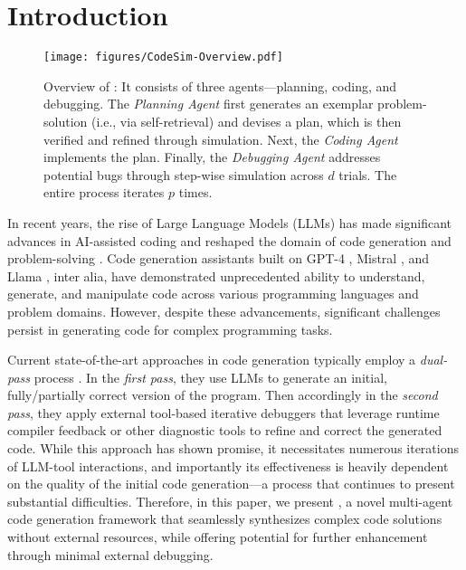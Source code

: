 \section{Introduction}
\label{sec:intro}


\begin{figure*}
    \centering
    \vspace{-4mm}
    \texttt{[image: figures/CodeSim-Overview.pdf]}
    \vspace{-4mm}
    \caption{Overview of \toolnospace: It consists of three agents—planning, coding, and debugging. The \emph{Planning Agent} first generates an exemplar problem-solution (i.e., via self-retrieval) and devises a plan, which is then verified and refined through simulation. Next, the \emph{Coding Agent} implements the plan. Finally, the \emph{Debugging Agent} addresses potential bugs through step-wise simulation across $d$ trials. The entire process iterates $p$ times.
    }
    \label{fig:overview}
    \vspace{-4mm}
\end{figure*}


In recent years, the rise of Large Language Models (LLMs) has made significant advances in AI-assisted coding and reshaped the domain of code generation and problem-solving \citep{LLMSurvey}. Code generation assistants built on GPT-4 \citep{openai2024gpt4technicalreport}, Mistral \citep{jiang2023mistral}, and Llama \citep{dubey2024llama3herdmodels}, inter alia, have demonstrated unprecedented ability to understand, generate, and manipulate code across various programming languages and problem domains. However, despite these advancements, significant challenges persist in generating code for complex programming tasks. 



Current state-of-the-art approaches in code generation typically employ a \emph{dual-pass} process \cite{shi2024code-mgdebug, jin2024rgd, zhong-etal-2024-debug, levin2024chatdbg}. In the \emph{first pass}, they use LLMs to generate an initial,  fully/partially correct version of the program. Then accordingly in the \emph{second pass}, they apply external tool-based iterative debuggers that leverage runtime compiler feedback or other diagnostic tools to refine and correct the generated code. While this approach has shown promise, it necessitates numerous iterations of LLM-tool interactions, and importantly its effectiveness is heavily dependent on the quality of the initial code generation—a process that continues to present substantial difficulties. Therefore, in this paper, we present {\bf \toolnospace}, a novel multi-agent code generation framework that seamlessly synthesizes complex code solutions without external resources, while offering potential for further enhancement through minimal external debugging. 
 

